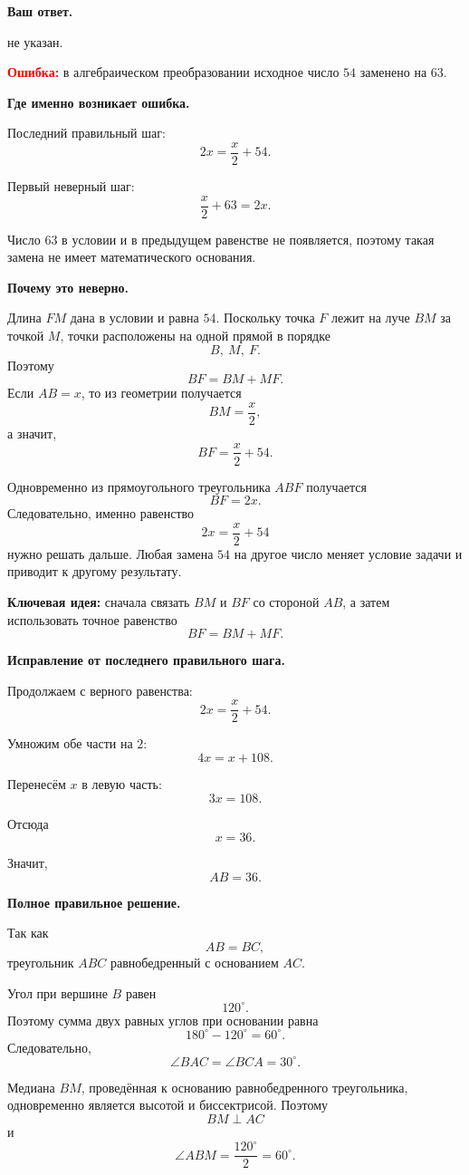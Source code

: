 \documentclass[12pt,a4paper]{article}
\begin{document}
\textbf{Ваш ответ.}

не указан.

\textcolor{red}{\textbf{Ошибка:}} в алгебраическом преобразовании исходное число $54$ заменено на $63$.

\textbf{Где именно возникает ошибка.}

Последний правильный шаг:
\[
2x=\frac{x}{2}+54.
\]

Первый неверный шаг:
\[
\frac{x}{2}+63=2x.
\]

Число $63$ в условии и в предыдущем равенстве не появляется, поэтому такая замена не имеет математического основания.

\textbf{Почему это неверно.}

Длина $FM$ дана в условии и равна $54$. Поскольку точка $F$ лежит на луче $BM$ за точкой $M$, точки расположены на одной прямой в порядке
\[
B,\ M,\ F.
\]
Поэтому
\[
BF=BM+MF.
\]
Если $AB=x$, то из геометрии получается
\[
BM=\frac{x}{2},
\]
а значит,
\[
BF=\frac{x}{2}+54.
\]

Одновременно из прямоугольного треугольника $ABF$ получается
\[
BF=2x.
\]
Следовательно, именно равенство
\[
2x=\frac{x}{2}+54
\]
нужно решать дальше. Любая замена $54$ на другое число меняет условие задачи и приводит к другому результату.

\textcolor{blue!60!black}{\textbf{Ключевая идея:}} сначала связать $BM$ и $BF$ со стороной $AB$, а затем использовать точное равенство
\[
BF=BM+MF.
\]

\textbf{Исправление от последнего правильного шага.}

Продолжаем с верного равенства:
\[
2x=\frac{x}{2}+54.
\]

Умножим обе части на $2$:
\[
4x=x+108.
\]

Перенесём $x$ в левую часть:
\[
3x=108.
\]

Отсюда
\[
x=36.
\]

Значит,
\[
AB=36.
\]

\textbf{Полное правильное решение.}

Так как
\[
AB=BC,
\]
треугольник $ABC$ равнобедренный с основанием $AC$.

Угол при вершине $B$ равен
\[
120^\circ.
\]
Поэтому сумма двух равных углов при основании равна
\[
180^\circ-120^\circ=60^\circ.
\]
Следовательно,
\[
\angle BAC=\angle BCA=30^\circ.
\]

Медиана $BM$, проведённая к основанию равнобедренного треугольника, одновременно является высотой и биссектрисой. Поэтому
\[
BM\perp AC
\]
и
\[
\angle ABM=\frac{120^\circ}{2}=60^\circ.
\]
\end{document}
